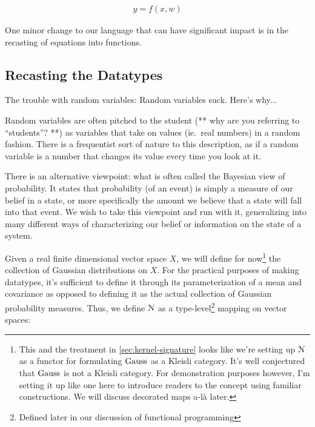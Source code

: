 \begin{equation}
    \begin{aligned}
	y = f(x,w)
    \end{aligned}
\end{equation}


One minor change to our language that can have significant impact is in the recasting of equations into functions.

\subsection{Recasting the Datatypes}
The trouble with random variables:
Random variables suck. Here's why...

Random variables are often pitched to the student (** why are you referring to ``students''? **) as variables that take on values (ie.\ real numbers) in a random fashion.
There is a frequentist sort of nature to this description, as if a random variable is a number that changes its value every time you look at it.

There is an alternative viewpoint: what is often called the Bayesian view of probability.
It states that probability (of an event) is simply a measure of our belief in a state, or more specifically the amount we believe that a state will fall into that event.
We wish to take this viewpoint and run with it, generalizing into many different ways of characterizing our belief or information on the state of a system.

Given a real finite dimensional vector space $X$, we will define for now\footnote{This and the treatment in \ref{sec:kernel-signature} looks like we're setting up $\mathcal{N}$ as a functor for formulating $\mathrm{Gauss}$ as a Kleisli category. It's well conjectured that $\mathrm{Gauss}$ is not a Kleisli category. For demonstration purposes however, I'm setting it up like one here to introduce readers to the concept using familiar constructions. We will discuss decorated maps a-l\`a \cite{stein2022extended} later.} the collection of Gaussian distributions on $X$.
For the practical purposes of making datatypes, it's sufficient to define it through its parameterization of a mean and covariance as opposed to defining it as the actual collection of Gaussian probability measures.
Thus, we define $\mathcal{N}$ as a type-level\footnote{Defined later in our discussion of functional programming} mapping on vector spaces:

